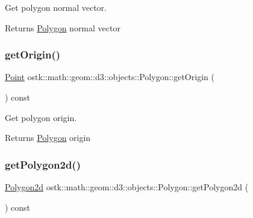Get polygon normal vector. 

\begin{DoxyReturn}{Returns}
\hyperlink{classostk_1_1math_1_1geom_1_1d3_1_1objects_1_1_polygon}{Polygon} normal vector 
\end{DoxyReturn}
\mbox{\label{classostk_1_1math_1_1geom_1_1d3_1_1objects_1_1_polygon_a5f5c92cc505de7264e041c799df9c8b8}} 
\subsubsection{\texorpdfstring{get\+Origin()}{getOrigin()}}
{\footnotesize\ttfamily \hyperlink{classostk_1_1math_1_1geom_1_1d3_1_1objects_1_1_point}{Point} ostk\+::math\+::geom\+::d3\+::objects\+::\+Polygon\+::get\+Origin (\begin{DoxyParamCaption}{ }\end{DoxyParamCaption}) const}



Get polygon origin. 

\begin{DoxyReturn}{Returns}
\hyperlink{classostk_1_1math_1_1geom_1_1d3_1_1objects_1_1_polygon}{Polygon} origin 
\end{DoxyReturn}
\mbox{\label{classostk_1_1math_1_1geom_1_1d3_1_1objects_1_1_polygon_a8a913803b3effdadc1072a1ae50fe827}} 
\subsubsection{\texorpdfstring{get\+Polygon2d()}{getPolygon2d()}}
{\footnotesize\ttfamily \hyperlink{namespaceostk_1_1math_1_1geom_1_1d3_1_1objects_ab51647b491a750a403dcaca4c2254905}{Polygon2d} ostk\+::math\+::geom\+::d3\+::objects\+::\+Polygon\+::get\+Polygon2d (\begin{DoxyParamCaption}{ }\end{DoxyParamCaption}) const}



